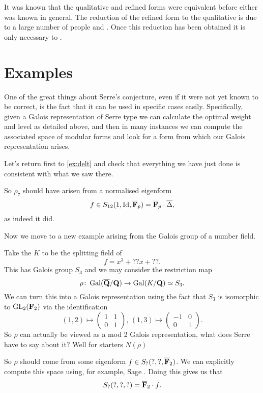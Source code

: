 \documentclass[a4paper,12pt]{article}
\begin{document}
It was known that the qualitative and refined forms were equivalent before either was known in general.
The reduction of the refined form to the qualitative is due to a large number of people and .
Once this reduction has been obtained it is only necessary to .


\section{Examples}
One of the great things about Serre's conjecture, even if it were not yet known to be correct, is the fact that it can be used in specific cases easily.
Specifically, given a Galois representation of Serre type we can calculate the optimal weight and level as detailed above, and then in many instances we can compute the associated space of modular forms and look for a form from which our Galois representation arises.

\begin{ex}
Let's return first to \cref{ex:delt} and check that everything we have just done is consistent with what we saw there.

So $\rho_{7}$ should have arisen from a normalised eigenform
\[
f\in S_{12}(1,\mathrm{Id},\overline{\mathbf{F}}_p) = \overline{\mathbf{F}}_p\cdot \overline{\Delta},
\]
as indeed it did.
\end{ex}

Now we move to a new example arising from the Galois group of a number field.

\begin{ex}
Take the $K$ to be the splitting field of
\[
f = x^3 + ??x + ??.
\]
This has Galois group $S_3$ and we may consider the restriction map
\[
\rho\colon \operatorname{Gal}(\overline{\mathbf{Q}}/\mathbf{Q}) \to \operatorname{Gal}(K/\mathbf{Q}) \simeq S_3.
\]
We can turn this into a Galois representation using the fact that $S_3$ is isomorphic to $\operatorname{GL}_2(\mathbf{F}_2)$ via the identification %
\[
(1, 2) \mapsto \begin{pmatrix} 1 & 1 \\ 0 & 1 \end{pmatrix},\,
(1, 3) \mapsto \begin{pmatrix} -1 & 0 \\ 0 & 1 \end{pmatrix}.
\]
So $\rho$ can actually be viewed as a mod 2 Galois representation, what does Serre have to say about it?
Well for starters $N(\rho)$

So $\rho$ should come from some eigenform $f \in S_?(?,?,\overline{\mathbf{F}}_2)$.
We can explicitly compute this space using, for example, Sage \cite{Sage}.
Doing this gives us that
\[
S_?(?,?,?) = \overline{\mathbf{F}}_2 \cdot f.
\]

\end{ex}
\end{document}

